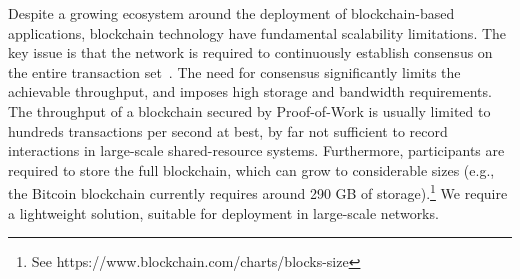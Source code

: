 Despite a growing ecosystem around the deployment of blockchain-based applications, blockchain technology have fundamental scalability limitations.
The key issue is that the network is required to continuously establish consensus on the entire transaction set~\cite{vukolic2015quest}.
The need for consensus significantly limits the achievable throughput, and imposes high storage and bandwidth requirements.
The throughput of a blockchain secured by Proof-of-Work is usually limited to hundreds transactions per second at best, by far not sufficient to record interactions in large-scale shared-resource systems.
Furthermore, participants are required to store the full blockchain, which can grow to considerable sizes (e.g., the Bitcoin blockchain currently requires around 290 GB of storage).\footnote{See https://www.blockchain.com/charts/blocks-size}
We require a lightweight solution, suitable for deployment in large-scale networks.





